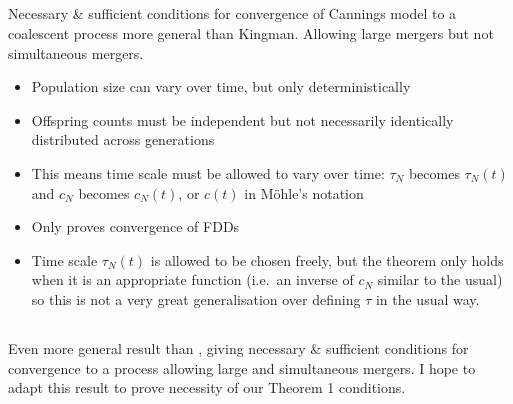\documentclass{article}
\begin{document}
\subsection*{\cite{mohle1998}}
Necessary \& sufficient conditions for convergence of Cannings model to a coalescent process more general than Kingman. Allowing large mergers but not simultaneous mergers.
\begin{itemize}
\item Population size can vary over time, but only deterministically
\item Offspring counts must be independent but not necessarily identically distributed across generations
\item This means time scale must be allowed to vary over time: $\tau_N$ becomes $\tau_N(t)$ and $c_N$ becomes $c_N(t)$, or $c(t)$ in M\"ohle's notation
\item Only proves convergence of FDDs
\item Time scale $\tau_N(t)$ is allowed to be chosen freely, but the theorem only holds when it is an appropriate function (i.e.\ an inverse of $c_N$ similar to the usual) so this is not a very great generalisation over defining $\tau$ in the usual way.
\end{itemize}

\subsection*{\cite{mohlesagitov1998}}

\subsection*{\cite{sagitov1999}}

\subsection*{\cite{mohle1999}}

\subsection*{\cite{mohle2000}}

\subsection*{\cite{mohle2001}}
Even more general result than \cite{mohle1998}, giving necessary \& sufficient conditions for convergence to a process allowing large and simultaneous mergers. I hope to adapt this result to prove necessity of our Theorem 1 conditions.
\end{document}
